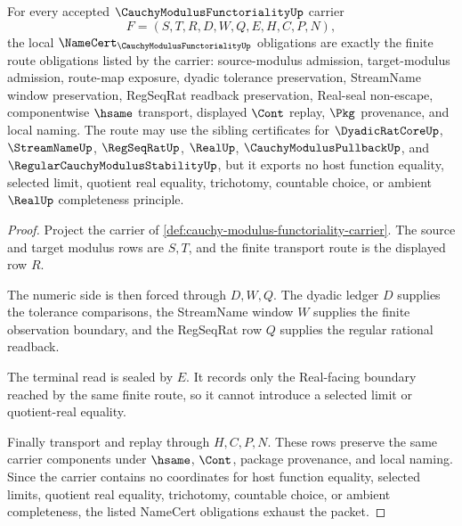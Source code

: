 \begin{theorem}
\label{thm:cauchy-modulus-functoriality-namecert-obligations}
For every accepted $\CauchyModulusFunctorialityUp$ carrier
$$
F=(S,T,R,D,W,Q,E,H,C,P,N),
$$
the local $\NameCert_{\CauchyModulusFunctorialityUp}$ obligations are exactly the finite route obligations listed by the carrier: source-modulus admission, target-modulus admission, route-map exposure, dyadic tolerance preservation, StreamName window preservation, RegSeqRat readback preservation, Real-seal non-escape, componentwise $\hsame$ transport, displayed $\Cont$ replay, $\Pkg$ provenance, and local naming. The route may use the sibling certificates for $\DyadicRatCoreUp$, $\StreamNameUp$, $\RegSeqRatUp$, $\RealUp$, $\CauchyModulusPullbackUp$, and $\RegularCauchyModulusStabilityUp$, but it exports no host function equality, selected limit, quotient real equality, trichotomy, countable choice, or ambient $\RealUp$ completeness principle.
\end{theorem}
\begin{proof}
Project the carrier of \autoref{def:cauchy-modulus-functoriality-carrier}. The source and target modulus rows are $S,T$, and the finite transport route is the displayed row $R$.

The numeric side is then forced through $D,W,Q$. The dyadic ledger $D$ supplies the tolerance comparisons, the StreamName window $W$ supplies the finite observation boundary, and the RegSeqRat row $Q$ supplies the regular rational readback.

The terminal read is sealed by $E$. It records only the Real-facing boundary reached by the same finite route, so it cannot introduce a selected limit or quotient-real equality.

Finally transport and replay through $H,C,P,N$. These rows preserve the same carrier components under $\hsame$, $\Cont$, package provenance, and local naming. Since the carrier contains no coordinates for host function equality, selected limits, quotient real equality, trichotomy, countable choice, or ambient completeness, the listed NameCert obligations exhaust the packet.
\end{proof}


